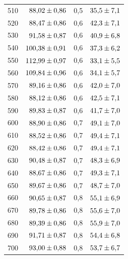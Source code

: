 \begin{longtable}{c r c r}
    510  & $\num{ 88.02+-0.86}$ & 0,5 & $\num{35.5+-7.1}$ \\
    520  & $\num{ 88.47+-0.86}$ & 0,6 & $\num{42.3+-7.1}$ \\
    530  & $\num{ 91.58+-0.87}$ & 0,6 & $\num{40.9+-6.8}$ \\
    540  & $\num{100.38+-0.91}$ & 0,6 & $\num{37.3+-6.2}$ \\
    550  & $\num{112.99+-0.97}$ & 0,6 & $\num{33.1+-5.5}$ \\
    560  & $\num{109.84+-0.96}$ & 0,6 & $\num{34.1+-5.7}$ \\
    570  & $\num{ 89.16+-0.86}$ & 0,6 & $\num{42.0+-7.0}$ \\
    580  & $\num{ 88.12+-0.86}$ & 0,6 & $\num{42.5+-7.1}$ \\
    590  & $\num{ 89.83+-0.87}$ & 0,6 & $\num{41.7+-7.0}$ \\
    600  & $\num{ 88.90+-0.86}$ & 0,7 & $\num{49.1+-7.0}$ \\
    610  & $\num{ 88.52+-0.86}$ & 0,7 & $\num{49.4+-7.1}$ \\
    620  & $\num{ 88.42+-0.86}$ & 0,7 & $\num{49.4+-7.1}$ \\
    630  & $\num{ 90.48+-0.87}$ & 0,7 & $\num{48.3+-6.9}$ \\
    640  & $\num{ 88.67+-0.86}$ & 0,7 & $\num{49.3+-7.1}$ \\
    650  & $\num{ 89.67+-0.86}$ & 0,7 & $\num{48.7+-7.0}$ \\
    660  & $\num{ 90.65+-0.87}$ & 0,8 & $\num{55.1+-6.9}$ \\
    670  & $\num{ 89.78+-0.86}$ & 0,8 & $\num{55.6+-7.0}$ \\
    680  & $\num{ 89.39+-0.86}$ & 0,8 & $\num{55.9+-7.0}$ \\
    690  & $\num{ 91.71+-0.87}$ & 0,8 & $\num{54.4+-6.8}$ \\
    700  & $\num{ 93.00+-0.88}$ & 0,8 & $\num{53.7+-6.7}$ \\
    \bottomrule
\end{longtable}